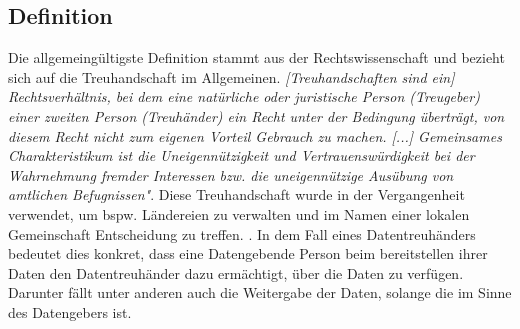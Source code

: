 \documentclass[11pt,a4paper]{scrreprt}
\begin{document}
\subsection{Definition}
 Die allgemeingültigste Definition stammt aus der Rechtswissenschaft und bezieht sich auf die Treuhandschaft im Allgemeinen. \textit{[Treuhandschaften sind ein] Rechtsverhältnis, bei dem eine natürliche oder juristische Person (Treugeber) einer zweiten Person (Treuhänder) ein Recht unter der Bedingung überträgt, von diesem Recht nicht zum eigenen Vorteil Gebrauch zu machen. [...] Gemeinsames Charakteristikum ist die Uneigennützigkeit und Vertrauenswürdigkeit bei der Wahrnehmung fremder Interessen bzw. die uneigennützige Ausübung von amtlichen Befugnissen"}\cite{dt-beeck2013treuhandschaft}. Diese Treuhandschaft wurde in der Vergangenheit verwendet, um bspw. Ländereien zu verwalten und im Namen einer lokalen Gemeinschaft Entscheidung zu treffen. \cite{dt-hardinges2018data}. In dem Fall eines Datentreuhänders bedeutet dies konkret, dass eine Datengebende Person beim bereitstellen ihrer Daten den Datentreuhänder dazu ermächtigt, über die Daten zu verfügen. Darunter fällt unter anderen auch die Weitergabe der Daten, solange die im Sinne des Datengebers ist. 



\end{document}
